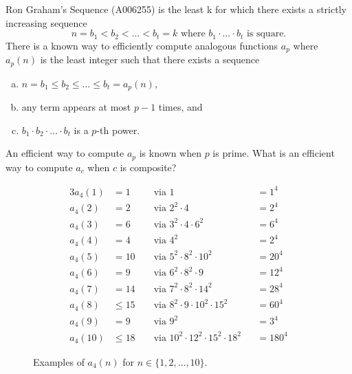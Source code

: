 \documentclass{article}
\begin{document}
Ron Graham's Sequence (A006255) is the least k for which there exists a
strictly increasing sequence \[
  n = b_1 < b_2 < \hdots < b_t = k \text{ where }
  b_1 \cdot\hdots\cdot b_t \text{ is square.}
\]
There is a known way to efficiently compute analogous functions $a_p$ where
$a_p(n)$ is the least integer such that there exists a sequence
\begin{enumerate}[(a)]
  \item $n = b_1 \leq b_2 \leq \hdots \leq b_t = a_p(n)$,
  \item any term appears at most $p - 1$ times, and
  \item $b_1 \cdot b_2 \cdot\hdots\cdot b_t$ is a $p$-th power.
\end{enumerate}
\begin{question}
  An efficient way to compute $a_p$ is known when $p$ is prime.
  What is an efficient way to compute $a_c$ when $c$ is composite?
\end{question}
\begin{figure}[!h]
  \centering
  \begin{alignat*}{3}
  a_4(1) &= 1      &&\text{ via } 1                                     &&= 1^4\\
  a_4(2) &= 2      &&\text{ via } 2^2 \cdot 4                           &&= 2^4\\
  a_4(3) &= 6      &&\text{ via } 3^2 \cdot 4 \cdot 6^2                 &&= 6^4\\
  a_4(4) &= 4      &&\text{ via } 4^2                                   &&= 2^4\\
  a_4(5) &= 10     &&\text{ via } 5^2 \cdot 8^2 \cdot 10^2              &&= 20^4\\
  a_4(6) &= 9      &&\text{ via } 6^2 \cdot 8^2 \cdot 9                 &&= 12^4\\
  a_4(7) &= 14     &&\text{ via } 7^2 \cdot 8^2 \cdot 14^2              &&= 28^4\\
  a_4(8) &\leq 15  &&\text{ via } 8^2 \cdot 9 \cdot 10^2 \cdot 15^2     &&= 60^4\\
  a_4(9) &= 9      &&\text{ via } 9^2                                   &&= 3^4\\
  a_4(10) &\leq 18 &&\text{ via } 10^2 \cdot 12^2 \cdot 15^2 \cdot 18^2 &&= 180^4
  \end{alignat*}
  \caption{
    Examples of $a_4(n)$ for $n \in \{1, 2,\hdots,10\}$.
  }
\end{figure}
\end{document}
